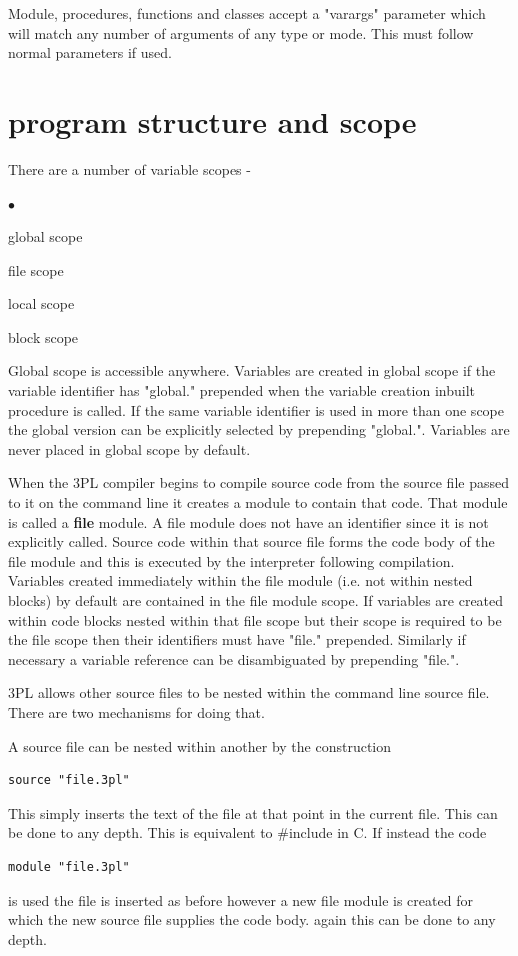 \documentclass[10pt,a4paper,twoside,fleqn]{article}
\newcommand{\blist}{\begin{list}{$\bullet$}{\setlength{\itemsep}{-5pt}\setlength{\topsep}{-5pt}}}
\newcommand{\blend}{\end{list}}
\begin{document}
    Module, procedures, functions and classes accept a "varargs" parameter which will
    match any number of arguments of any type or mode. This must follow normal
    parameters if used.
    
    


\section{program structure and scope}

    There are a number of variable scopes -

    \blist
    \item   global scope
    \item   file scope
    \item   local scope
    \item   block scope
    \blend
    
    Global scope is accessible anywhere. Variables are created in global scope if
    the variable identifier has "global." prepended when the variable creation
    inbuilt procedure is called. If the same variable identifier is used in more
    than one scope the global version can be explicitly selected by prepending
    "global.". Variables are never placed in global scope by default.
    
    When the 3PL compiler begins to compile source code from the source file passed
    to it on the command line it creates a module to contain that code. That module
    is called a {\bf file} module. A file module does not have an identifier since
    it is not explicitly called. Source code within that source file forms the code
    body of the file module and this is executed by the interpreter following
    compilation. Variables created immediately within the file module (i.e. not
    within nested blocks) by default are contained in the file module scope.
    If variables are created within code blocks nested within that file
    scope but their scope is required to be the file scope then their
    identifiers must have "file." prepended. Similarly if necessary a variable
    reference can be disambiguated by prepending "file.".
    
    3PL allows other source files to be nested within the command line source
    file. There are two mechanisms for doing that.
    
    A source file can be nested within another by the construction    
    \begin{lstlisting}[language=threepl]
        source "file.3pl"
    \end{lstlisting}
    This simply inserts the text of the file at that point in the current file.
    This can be done to any depth.
    This is equivalent to \#include in C. If instead the code
    \begin{lstlisting}[language=threepl]
        module "file.3pl"
    \end{lstlisting}
    is used the file is inserted as before however a new file module is created
    for which the new source file supplies the code body. again this can be done to
    any depth.
    
\end{document}
